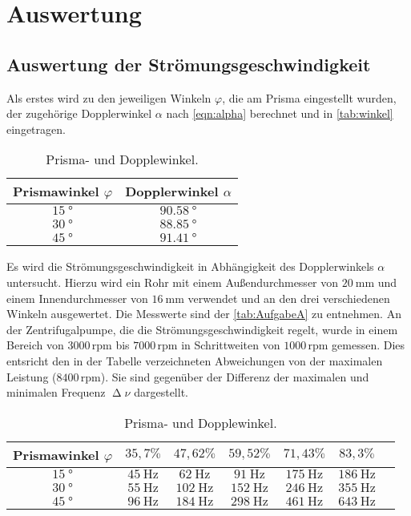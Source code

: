 \section{Auswertung}
\label{sec:Auswertung}

\subsection{Auswertung der Strömungsgeschwindigkeit}
\label{subsec:stroemi}
Als erstes wird zu den jeweiligen Winkeln $\varphi$, die am Prisma eingestellt wurden, der zugehörige Dopplerwinkel $\alpha$ nach \autoref{eqn:alpha}
berechnet und in \autoref{tab:winkel} eingetragen.
\begin{table}[H]
  \centering
  \caption{Prisma- und Dopplewinkel.}
  \label{tab:winkel}
  \begin{tabular}{c c}
    \toprule
    Prismawinkel $\varphi$ & Dopplerwinkel $\alpha$ \\
    \midrule
    $\SI{15}{\degree}$ & $\SI{90,58}{\degree}$ \\
    $\SI{30}{\degree}$ & $\SI{88,85}{\degree}$ \\
    $\SI{45}{\degree}$ & $\SI{91,41}{\degree}$ \\
    \bottomrule
  \end{tabular}
\end{table}

\noindent
Es wird die Strömungsgeschwindigkeit in Abhängigkeit des Dopplerwinkels $\alpha$ untersucht. Hierzu wird ein Rohr mit einem Außendurchmesser von $\SI{20}{\milli\meter}$
und einem Innendurchmesser von $\SI{16}{\milli\meter}$ verwendet und an den drei verschiedenen Winkeln ausgewertet. Die Messwerte sind der \autoref{tab:AufgabeA} zu entnehmen.
An der Zentrifugalpumpe, die die Strömungsgeschwindigkeit regelt, wurde in einem Bereich von $3000 \,\text{rpm}$ bis $7000 \,\text{rpm}$ in Schrittweiten von $1000 \,\text{rpm}$ gemessen. Dies entsricht den in der
Tabelle verzeichneten Abweichungen von der maximalen Leistung ($8400\, \text{rpm}$). Sie sind gegenüber der Differenz der maximalen und minimalen Frequenz $\upDelta \nu$ dargestellt.
\begin{table}[H]
  \centering
  \caption{Prisma- und Dopplewinkel.}
  \label{tab:AufgabeA}
  \begin{tabular}{c c c c c c c}
    \toprule
    Prismawinkel $\varphi$ & $35,7 \%$ & $47,62 \%$ & $59,52 \%$ & $71,43 \%$ & $83,3 \%$\\
    \midrule
    $\SI{15}{\degree}$ & $\SI{45}{\hertz}$ & $\SI{62}{\hertz}$ & $\SI{91}{\hertz}$ & $\SI{175}{\hertz}$ & $\SI{186}{\hertz}$ \\
    $\SI{30}{\degree}$ & $\SI{55}{\hertz}$ & $\SI{102}{\hertz}$ & $\SI{152}{\hertz}$ & $\SI{246}{\hertz}$ & $\SI{355}{\hertz}$ \\
    $\SI{45}{\degree}$ & $\SI{96}{\hertz}$ & $\SI{184}{\hertz}$ & $\SI{298}{\hertz}$ & $\SI{461}{\hertz}$ & $\SI{643}{\hertz}$ \\
    \bottomrule
  \end{tabular}
\end{table}

